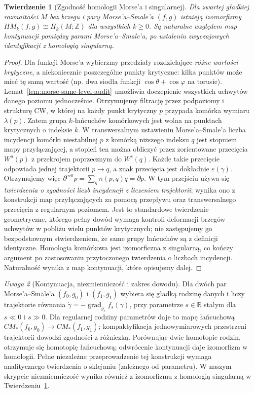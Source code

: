 \documentclass[11pt,a4paper,oneside]{report}
\newcommand{\R}{\mathbb{R}}
\newcommand{\Z}{\mathbb{Z}}
\theoremstyle{plain}
\newtheorem{twierdzenie}{Twierdzenie}[section]
\theoremstyle{definition}
\theoremstyle{remark}
\newtheorem{uwaga}[twierdzenie]{Uwaga}
\begin{document}
\begin{twierdzenie}[Zgodność homologii Morse'a i singularnej]
\label{thm:morse-singular-v10}
Dla zwartej gładkiej rozmaitości $M$ bez brzegu i pary
Morse'a--Smale'a $(f,g)$ istnieją izomorfizmy
$HM_k(f,g)\cong H_k(M;\Z)$ dla wszystkich $k\ge0$.
Są naturalne względem map kontynuacji pomiędzy
parami Morse'a--Smale'a, po ustaleniu zwyczajowych
identyfikacji z homologią singularną.
\end{twierdzenie}
\begin{proof}
Dla funkcji Morse'a wybierzmy przedziały rozdzielające
\emph{różne wartości krytyczne}, a niekoniecznie poszczególne
punkty krytyczne: kilka punktów może mieć tę samą wartość
(np. dwa siodła funkcji $\cos\theta+\cos\varphi$ na torusie).
Lemat~\ref{lem:morse-same-level-audit} umożliwia doczepienie
wszystkich uchwytów danego poziomu jednocześnie. Otrzymujemy
filtrację przez podpoziomy i strukturę CW, w której na każdy
punkt krytyczny $p$ przypada komórka wymiaru $\lambda(p)$.
Zatem grupa $k$-łańcuchów komórkowych jest wolna na punktach
krytycznych o indeksie $k$.
W transwersalnym ustawieniu Morse'a--Smale'a liczba
incydencji komórki niestabilnej $p$ z komórką
niższego indeksu $q$ jest stopniem mapy przyłączającej,
a stopień ten można obliczyć przez zorientowane przecięcia
$W^u(p)$ z przekrojem poprzecznym do $W^s(q)$.
Każde takie przecięcie odpowiada jednej trajektorii
$p\to q$, a znak przecięcia jest dokładnie
$\varepsilon(\gamma)$. Otrzymujemy więc
$\partial^{\mathrm{cell}}p=\sum_qn(p,q)q=\partial p$.
W tym przejściu używa się \emph{twierdzenia o zgodności
liczb incydencji z liczeniem trajektorii}; wynika ono
z konstrukcji map przyłączających za pomocą przepływu
oraz transwersalnego przecięcia z regularnym poziomem.
Jest to standardowe twierdzenie geometryczne, którego
pełny dowód wymaga kontroli deformacji brzegów
uchwytów w pobliżu wielu punktów krytycznych; nie
zastępujemy go bezpodstawnym stwierdzeniem, że
same grupy łańcuchów są z definicji identyczne.
Homologia komórkowa jest izomorficzna z singularną,
co kończy argument po zastosowaniu przytoczonego
twierdzenia o liczbach incydencji. Naturalność
wynika z map kontynuacji, które opisujemy dalej.
\end{proof}

\begin{uwaga}[Kontynuacja, niezmienniczość i zakres dowodu]
Dla dwóch par Morse'a--Smale'a $(f_0,g_0)$ i $(f_1,g_1)$
wybiera się gładką rodzinę danych i liczy trajektorie równania
$\dot\gamma=-\operatorname{grad}_{g_s}f_s(\gamma)$,
przy parametrze $s\in\R$ stałym dla $s\ll0$ i $s\gg0$.
Dla regularnej rodziny parametrów daje to mapę łańcuchową
$CM_*(f_0,g_0)\to CM_*(f_1,g_1)$; kompaktyfikacja
jednowymiarowych przestrzeni trajektorii dowodzi zgodności
z różniczką. Porównując dwie homotopie rodzin,
otrzymuje się homotopię łańcuchową; odwrócenie
kontynuacji daje izomorfizm w homologii.
Pełne niezależne przeprowadzenie tej konstrukcji
wymaga analitycznego twierdzenia o sklejaniu
(zależnego od parametru). W naszym skrypcie
niezmienniczość wynika również z izomorfizmu
z homologią singularną w Twierdzeniu~\ref{thm:morse-singular-v10}.
\end{uwaga}
\end{document}
